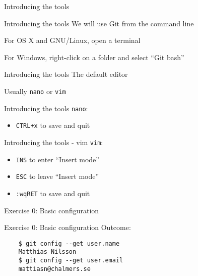 \documentclass{beamer}
\begin{document}
\begin{frame}{}
  \center
  \Huge Introducing the tools
\end{frame}

\begin{frame}{Introducing the tools}
  \center
  \Huge We will use Git from the command line
  \pause

  \large For OS X and GNU/Linux, open a terminal

  \large For Windows, right-click on a folder and select ``Git bash''
\end{frame}

\begin{frame}{Introducing the tools}
  \center
  \Huge The default editor
  \pause

  \huge Usually \texttt{nano} or \texttt{vim}
\end{frame}

\begin{frame}{Introducing the tools}
  \Huge \texttt{nano}:

  \begin{itemize}
    \item \Huge \texttt{CTRL+x} to save and quit
  \end{itemize}
\end{frame}

\begin{frame}{Introducing the tools - vim}
  \Huge \texttt{vim}:

  \begin{itemize}
    \item \Huge \texttt{INS} to enter ``Insert mode''
    \item \Huge \texttt{ESC} to leave ``Insert mode''
    \item \Huge \texttt{:wqRET} to save and quit
  \end{itemize}
\end{frame}

\begin{frame}{}
  \center
  \Huge Exercise 0: Basic configuration
\end{frame}

\begin{frame}[fragile]{Exercise 0: Basic configuration}
  Outcome:

  \begin{verbatim}
    $ git config --get user.name
    Matthias Nilsson
    $ git config --get user.email
    mattiasn@chalmers.se
  \end{verbatim}
\end{frame}
\end{document}
